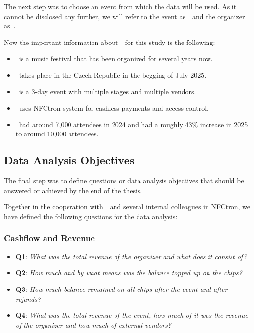 The next step was to choose an event from which the data will be used.
As it cannot be disclosed any further, we will refer to the event as~\theEvent~and the organizer as~\theOrganizer.

Now the important information about~\theEvent~for this study is the following:
\begin{itemize}
	\item \theEvent~is a music festival that has been organized for several years now.
	\item \theEvent~takes place in the Czech Republic in the begging of July 2025.
	\item \theEvent~is a 3-day event with multiple stages and multiple vendors.
	\item \theEvent~uses NFCtron system for cashless payments and access control.
	\item \theEvent~had around 7,000 attendees in 2024 and had a roughly 43\% increase in 2025 to around 10,000 attendees.
\end{itemize}

\subsection*{Data Analysis Objectives}
\label{subsec:introduction-objectives-data-analysis}

The final step was to define questions or data analysis objectives that should be answered or achieved by the end of the thesis.

Together in the cooperation with~\theOrganizer~and several internal colleagues in NFCtron, we have defined the following questions for the data analysis:

\subsubsection*{Cashflow and Revenue}
\begin{itemize}
	\item \textbf{Q1}: \textit{What was the total revenue of the organizer and what does it consist of?}
	\item \textbf{Q2}: \textit{How much and by what means was the balance topped up on the chips?}
	\item \textbf{Q3}: \textit{How much balance remained on all chips after the event and after refunds?}
	\item \textbf{Q4}: \textit{What was the total revenue of the event, how much of it was the revenue of the organizer and how much of external vendors?}
\end{itemize}

